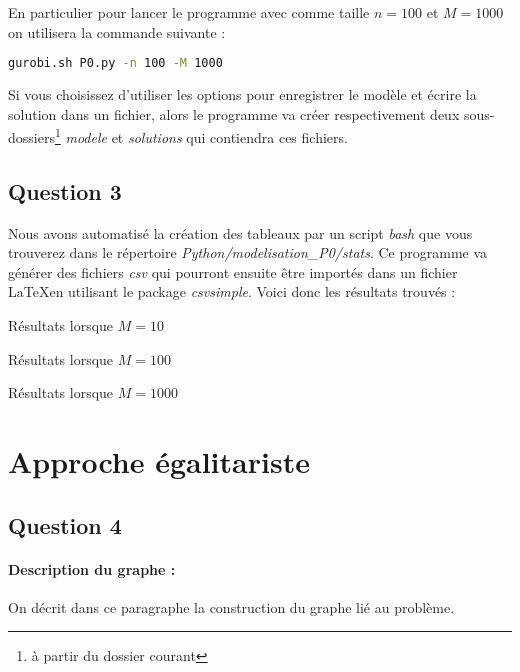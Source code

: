 \documentclass[a4paper, titlepage, oneside, 12pt]{article}%
\begin{document}
En particulier pour lancer le programme avec comme taille $n=100$ et $M=1000$ on utilisera la commande suivante :
\begin{lstlisting}[language=bash]
gurobi.sh P0.py -n 100 -M 1000
\end{lstlisting}

Si vous choisissez d'utiliser les options pour enregistrer le modèle et écrire la solution dans un fichier, alors le programme va créer respectivement deux sous-dossiers\footnote{à partir du dossier courant} \textit{modele} et \textit{solutions} qui contiendra ces fichiers.

\subsection{Question 3}

Nous avons automatisé la création des tableaux par un script \textit{bash} que vous trouverez dans le répertoire \textit{Python/modelisation\_P0/stats}. Ce programme va générer des fichiers \textit{csv} qui pourront ensuite être importés dans un fichier \LaTeX en utilisant le package \textit{csvsimple}. Voici donc les résultats trouvés :

\begin{table}
\caption{Résultats lorsque $M=10$}
\end{table}

\begin{table}
\caption{Résultats lorsque $M=100$}
\end{table}

\begin{table}
\caption{Résultats lorsque $M=1000$}
\end{table}
\section{Approche égalitariste}
\subsection{Question 4}
\paragraph{Description du graphe : } On décrit dans ce paragraphe la construction du graphe lié au problème. 
\end{document}
